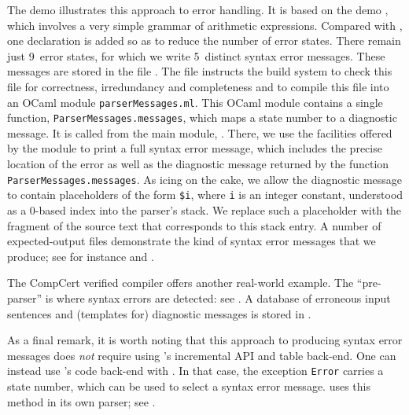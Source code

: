 \documentclass[onecolumn,11pt,nocopyrightspace,preprint]{sigplanconf}
\begin{document}
The demo  illustrates this approach to error
handling. It is based on the demo , which involves a very
simple grammar of arithmetic expressions. Compared with ,
one \donerrorreduce declaration is added so as to reduce the number of error
states. There remain just 9~error states, for which we write 5~distinct syntax
error messages. These messages are stored in the file
.
%
The file  instructs the build system to
check this file for correctness, irredundancy and completeness and to compile
this file into an OCaml module \verb+parserMessages.ml+.
%
This OCaml module contains a single function, \verb+ParserMessages.messages+,
which maps a state number to a diagnostic message. It is called from the main
module, .
%
There, we use the facilities offered by the module
\menhirliberrorreports to print a full syntax error message,
which includes the precise location of the error as well as
the diagnostic message returned by
the function \verb+ParserMessages.messages+.
%
As icing on the cake, we allow the diagnostic message to contain placeholders
of the form
\verb+$i+, where \verb+i+ is an integer constant, understood as a 0-based
index into the parser's stack. We replace such a placeholder with the fragment
of the source text that corresponds to this stack entry.
%
A number of expected-output files demonstrate the kind of syntax error
messages that we produce; see for instance
 and
.

The CompCert verified compiler offers another real-world example. The
``pre-parser'' is where syntax errors are detected: see
.
A database of erroneous input sentences and (templates for) diagnostic
messages is stored in .

As a final remark, it is worth noting that this approach to producing syntax
error messages does \emph{not} require using \menhir's incremental API and
table back-end. One can instead use \menhir's code back-end with
\oexncarriesstate. In that case, the exception \texttt{Error} carries a state
number, which can be used to select a syntax error message.
\menhir uses this method in its own parser; see
.
\end{document}
